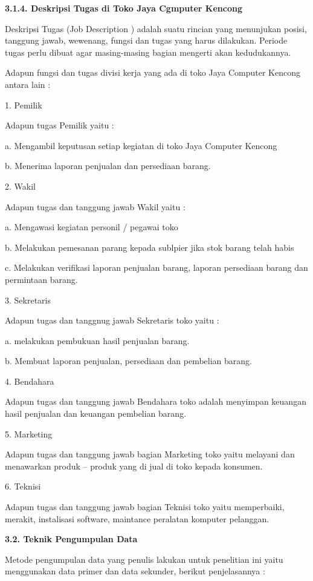 \documentclass[11pt]{article}
\begin{document}
\textbf{3.1.4. Deskripsi Tugas di Toko Jaya Cgmputer Kencong}

Deskripsi Tugas (Job Description ) adalah suatu rincian yang menunjukan posisi, tanggung jawab, wewenang, fungsi dan tugas yang harus dilakukan. Periode tugas perlu dibuat agar masing-masing bagian mengerti akan kedudukannya.

\newpage 

Adapun fungsi dan tugas divisi kerja yang ada di toko Jaya Computer Kencong antara lain :

1. Pemilik

Adapun tugas Pemilik yaitu :

a. Mengambil keputusan setiap kegiatan di toko Jaya Computer Kencong

b. Menerima laporan penjualan dan persediaan barang.

2. Wakil

Adapun tugas dan tanggung jawab Wakil yaitu :

a. Mengawasi kegiatan personil / pegawai toko

b. Melakukan pemesanan parang kepada sublpier jika stok barang telah habis

c. Melakukan verifikasi laporan penjualan barang, laporan persediaan barang dan
permintaan barang.

3. Sekretaris

Adapun tugas dan tanggnug jawab Sekretaris toko yaitu :

a. melakukan pembukuan hasil penjualan barang.

b. Membuat laporan penjualan, persediaan dan pembelian barang.

4. Bendahara

Adapun tugas dan tanggung jawab Bendahara toko adalah menyimpan keuangan hasil penjualan dan keuangan pembelian barang.

5. Marketing

Adapun tugas dan tanggung jawab bagian Marketing toko yaitu melayani dan menawarkan produk – produk yang di jual di toko kepada konsumen.

6. Teknisi

Adapun tugas dan tanggung jawab bagian Teknisi toko yaitu memperbaiki, merakit, instalisasi software, maintance peralatan komputer pelanggan.

\textbf{3.2. Teknik Pengumpulan Data}

Metode pengumpulan data yang penulis lakukan untuk penelitian ini yaitu menggunakan data primer dan data sekunder, berikut penjelasannya :
\end{document}
